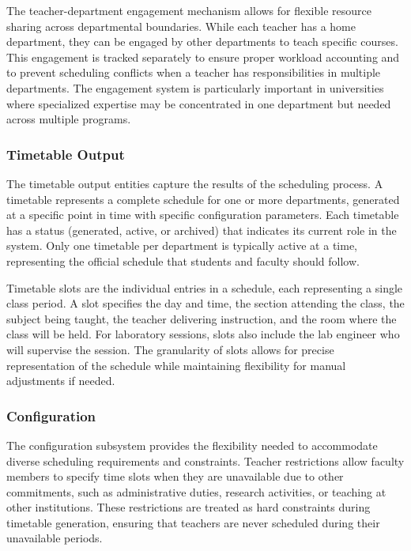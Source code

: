 \documentclass[12pt,a4paper]{article}
\begin{document}
The teacher-department engagement mechanism allows for flexible resource sharing across departmental boundaries. While each teacher has a home department, they can be engaged by other departments to teach specific courses. This engagement is tracked separately to ensure proper workload accounting and to prevent scheduling conflicts when a teacher has responsibilities in multiple departments. The engagement system is particularly important in universities where specialized expertise may be concentrated in one department but needed across multiple programs.

\subsubsection{Timetable Output}

The timetable output entities capture the results of the scheduling process. A timetable represents a complete schedule for one or more departments, generated at a specific point in time with specific configuration parameters. Each timetable has a status (generated, active, or archived) that indicates its current role in the system. Only one timetable per department is typically active at a time, representing the official schedule that students and faculty should follow.

Timetable slots are the individual entries in a schedule, each representing a single class period. A slot specifies the day and time, the section attending the class, the subject being taught, the teacher delivering instruction, and the room where the class will be held. For laboratory sessions, slots also include the lab engineer who will supervise the session. The granularity of slots allows for precise representation of the schedule while maintaining flexibility for manual adjustments if needed.

\subsubsection{Configuration}

The configuration subsystem provides the flexibility needed to accommodate diverse scheduling requirements and constraints. Teacher restrictions allow faculty members to specify time slots when they are unavailable due to other commitments, such as administrative duties, research activities, or teaching at other institutions. These restrictions are treated as hard constraints during timetable generation, ensuring that teachers are never scheduled during their unavailable periods.
\end{document}
